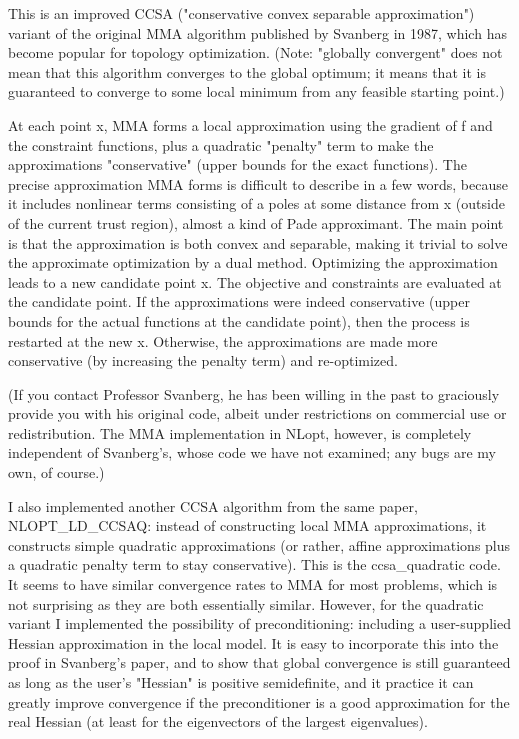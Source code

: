 This is an improved CCSA ("conservative convex separable approximation") variant of the original MMA algorithm published by Svanberg in 1987, which has become popular for topology optimization. (Note: "globally convergent" does not mean that this algorithm converges to the global optimum; it means that it is guaranteed to converge to some local minimum from any feasible starting point.) 

At each point x, MMA forms a local approximation using the gradient of f and the constraint functions, plus a quadratic "penalty" term to make the approximations "conservative" (upper bounds for the exact functions). The precise approximation MMA forms is difficult to describe in a few words, because it includes nonlinear terms consisting of a poles at some distance from x (outside of the current trust region), almost a kind of Pade approximant. The main point is that the approximation is both convex and separable, making it trivial to solve the approximate optimization by a dual method. Optimizing the approximation leads to a new candidate point x. The objective and constraints are evaluated at the candidate point. If the approximations were indeed conservative (upper bounds for the actual functions at the candidate point), then the process is restarted at the new x. Otherwise, the approximations are made more conservative (by increasing the penalty term) and re-optimized. 

(If you contact Professor Svanberg, he has been willing in the past to graciously provide you with his original code, albeit under restrictions on commercial use or redistribution. The MMA implementation in NLopt, however, is completely independent of Svanberg's, whose code we have not examined; any bugs are my own, of course.) 

I also implemented another CCSA algorithm from the same paper, NLOPT\_LD\_CCSAQ: instead of constructing local MMA approximations, it constructs simple quadratic approximations (or rather, affine approximations plus a quadratic penalty term to stay conservative). This is the ccsa\_quadratic code. It seems to have similar convergence rates to MMA for most problems, which is not surprising as they are both essentially similar. However, for the quadratic variant I implemented the possibility of preconditioning: including a user-supplied Hessian approximation in the local model. It is easy to incorporate this into the proof in Svanberg's paper, and to show that global convergence is still guaranteed as long as the user's "Hessian" is positive semidefinite, and it practice it can greatly improve convergence if the preconditioner is a good approximation for the real Hessian (at least for the eigenvectors of the largest eigenvalues). 



